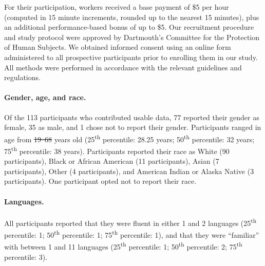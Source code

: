 \documentclass[10pt]{article}
\providecommand{\DIFaddtex}[1]{{\protect\color{blue}\uwave{#1}}} %
\providecommand{\DIFdeltex}[1]{{\protect\color{red}\sout{#1}}}                      %
\providecommand{\DIFaddbegin}{} %
\providecommand{\DIFaddend}{} %
\providecommand{\DIFdelbegin}{} %
\providecommand{\DIFdelend}{} %
\providecommand{\DIFadd}[1]{\texorpdfstring{\DIFaddtex{#1}}{#1}} %
\providecommand{\DIFdel}[1]{\texorpdfstring{\DIFdeltex{#1}}{}} %
\newcommand{\DIFscaledelfig}{0.5}
\newlength{\DIFdelgraphicswidth} %
\newlength{\DIFdelgraphicsheight} %
\newcommand{\DIFaddincludegraphics}[2][]{{\color{blue}\fbox{\DIFOincludegraphics[#1]{#2}}}} %
\newcommand{\DIFdelincludegraphics}[2][]{%
\sbox{\DIFdelgraphicsbox}{\DIFOincludegraphics[#1]{#2}}%
\settoboxwidth{\DIFdelgraphicswidth}{\DIFdelgraphicsbox} %
\settoboxtotalheight{\DIFdelgraphicsheight}{\DIFdelgraphicsbox} %
\scalebox{\DIFscaledelfig}{%
\parbox[b]{\DIFdelgraphicswidth}{\usebox{\DIFdelgraphicsbox}\\[-\baselineskip] \rule{\DIFdelgraphicswidth}{0em}}\llap{\resizebox{\DIFdelgraphicswidth}{\DIFdelgraphicsheight}{%
\setlength{\unitlength}{\DIFdelgraphicswidth}%
\begin{picture}(1,1)%
\thicklines\linethickness{2pt} %
{\color[rgb]{1,0,0}\put(0,0){\framebox(1,1){}}}%
{\color[rgb]{1,0,0}\put(0,0){\line( 1,1){1}}}%
{\color[rgb]{1,0,0}\put(0,1){\line(1,-1){1}}}%
\end{picture}%
}\hspace*{3pt}}} %
} %
\DeclareRobustCommand{\DIFaddbegin}{\DIFOaddbegin \let\includegraphics\DIFaddincludegraphics} %
\DeclareRobustCommand{\DIFaddend}{\DIFOaddend \let\includegraphics\DIFOincludegraphics} %
\DeclareRobustCommand{\DIFdelbegin}{\DIFOdelbegin \let\includegraphics\DIFdelincludegraphics} %
\DeclareRobustCommand{\DIFdelend}{\DIFOaddend \let\includegraphics\DIFOincludegraphics} %
\begin{document}
For their participation, workers received a base payment of \$5 per
hour (computed in 15 minute increments, rounded up to the nearest 15
minutes), plus an additional performance-based bonus of up to \$5.
Our recruitment procedure and study protocol were approved by
Dartmouth's Committee for the Protection of Human Subjects.  We
obtained informed consent using an online form administered to all
prospective participants prior to enrolling them in our study.  All
methods were performed in accordance with the relevant guidelines and
regulations.

\paragraph{Gender, age, and race.}
Of the 113 participants who contributed usable data, 77 reported their gender as female, 35 as
male, and 1 chose not to report their gender.  Participants ranged in
age from \DIFdelbegin \DIFdel{19--68 }\DIFdelend \DIFaddbegin \DIFadd{19 to 68 }\DIFaddend years old (25\textsuperscript{th} percentile: 28.25
years; 50\textsuperscript{th} percentile: 32 years;
75\textsuperscript{th} percentile: 38 years).  Participants reported
their race as White (90 participants), Black or African American (11
participants), Asian (7 participants), Other (4 participants), and
American Indian or Alaska Native (3 participants).  One participant
opted not to report their race.

\paragraph{Languages.}
All participants reported that they were fluent in either 1 and 2
languages (25\textsuperscript{th} percentile: 1;
50\textsuperscript{th} percentile: 1; 75\textsuperscript{th}
percentile: 1), and that they were ``familiar'' with between 1 and 11
languages (25\textsuperscript{th} percentile: 1;
50\textsuperscript{th} percentile: 2; 75\textsuperscript{th}
percentile: 3).
\end{document}
